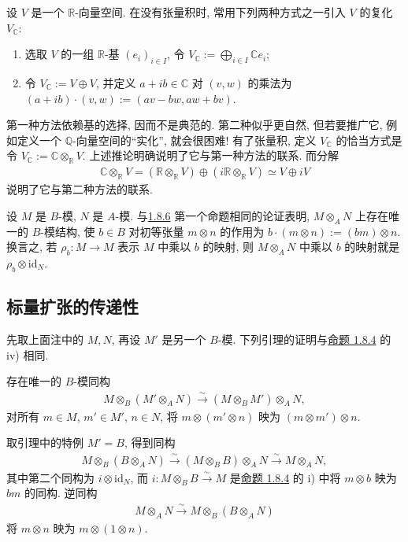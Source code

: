 \begin{example*}
设 $V$ 是一个 $\mathbb R$-向量空间. 在没有张量积时, 常用下列两种方式之一引入 $V$ 的复化 $V_{\mathbb C}$:
\begin{enumerate}
\item 选取 $V$ 的一组 $\mathbb R$-基 $(e_i)_{i\in I}$, 令 $V_{\mathbb C}:=\bigoplus_{i\in I}\mathbb C e_i$;
\item 令 $V_{\mathbb C}:=V\oplus V$, 并定义 $a+ib\in\mathbb C$ 对 $(v,w)$ 的乘法为 $(a+ib)\cdot(v,w):=(av-bw,aw+bv)$.
\end{enumerate}
第一种方法依赖基的选择, 因而不是典范的. 第二种似乎更自然, 但若要推广它, 例如定义一个 $\mathbb Q$-向量空间的``实化'', 就会很困难! 有了张量积, 定义 $V_{\mathbb C}$ 的恰当方式是令 $V_{\mathbb C}:=\mathbb C\otimes_{\mathbb R}V$. 上述推论明确说明了它与第一种方法的联系. 而分解
\begin{align*}
\mathbb C\otimes_{\mathbb R}V
=(\mathbb R\otimes_{\mathbb R}V)\oplus(i\mathbb R\otimes_{\mathbb R}V)
\simeq V\oplus iV
\end{align*}
说明了它与第二种方法的联系.
\end{example*}
\begin{remark*}
设 $M$ 是 $B$-模, $N$ 是 $A$-模. 与\hyperref[sec:galois-1-8-6]{1.8.6} 第一个命题相同的论证表明, $M\otimes_A N$ 上存在唯一的 $B$-模结构, 使 $b\in B$ 对初等张量 $m\otimes n$ 的作用为 $b\cdot(m\otimes n):=(bm)\otimes n$. 换言之, 若 $\rho_b:M\longrightarrow M$ 表示 $M$ 中乘以 $b$ 的映射, 则 $M\otimes_A N$ 中乘以 $b$ 的映射就是 $\rho_b\otimes\mathrm{id}_N$.
\end{remark*}

\subsection{标量扩张的传递性}\label{sec:galois-1-8-7}
先取上面注中的 $M,N$, 再设 $M'$ 是另一个 $B$-模. 下列引理的证明与\hyperref[sec:galois-1-8-4]{命题 1.8.4} 的 iv) 相同.
\begin{lemma*}
存在唯一的 $B$-模同构
\begin{align*}
M\otimes_B(M'\otimes_A N)\xrightarrow{\sim}(M\otimes_B M')\otimes_A N,
\end{align*}
对所有 $m\in M$, $m'\in M'$, $n\in N$, 将 $m\otimes(m'\otimes n)$ 映为 $(m\otimes m')\otimes n$.
\end{lemma*}
取引理中的特例 $M'=B$, 得到同构
\begin{align*}
M\otimes_B(B\otimes_A N)\xrightarrow{\sim}(M\otimes_B B)\otimes_A N\xrightarrow{\sim}M\otimes_A N,
\end{align*}
其中第二个同构为 $i\otimes\mathrm{id}_N$, 而 $i:M\otimes_B B\xrightarrow{\sim}M$ 是\hyperref[sec:galois-1-8-4]{命题 1.8.4} 的 i) 中将 $m\otimes b$ 映为 $bm$ 的同构. 逆同构
\begin{align*}
M\otimes_A N\xrightarrow{\sim}M\otimes_B(B\otimes_A N)
\end{align*}
将 $m\otimes n$ 映为 $m\otimes(1\otimes n)$.

